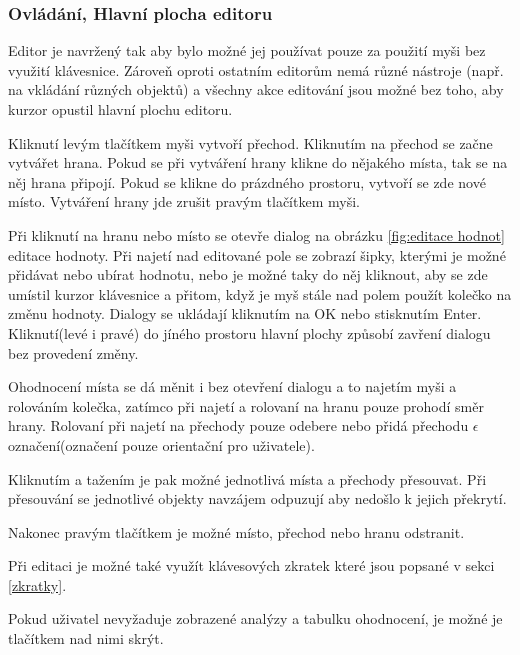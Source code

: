 \documentclass[
  biblatex,
  glossaries,
  printversion
]{kidiplom}
\begin{document}
\subsubsection{Ovládání, Hlavní plocha editoru}\label{hlavní plocha}

Editor je navržený tak aby bylo možné jej používat pouze za použití 
myši bez využití klávesnice. Zároveň oproti ostatním editorům
nemá různé nástroje (např. na vkládání různých objektů) a všechny 
akce editování jsou možné bez toho, aby kurzor opustil hlavní plochu editoru.

Kliknutí levým tlačítkem myši vytvoří přechod. 
Kliknutím na přechod se začne vytvářet hrana. Pokud se při 
vytváření hrany klikne do nějakého místa, tak se na něj hrana 
připojí. Pokud se klikne do prázdného prostoru, vytvoří se zde nové místo.
Vytváření hrany jde zrušit pravým tlačítkem myši.

Při kliknutí na hranu nebo místo se otevře dialog 
na obrázku \ref{fig:editace hodnot} editace hodnoty.
Při najetí nad editované pole se zobrazí šipky, kterými 
je možné přidávat nebo ubírat hodnotu, nebo je možné taky 
do něj kliknout, aby se zde umístil kurzor klávesnice a 
přitom, když je myš stále nad polem použít kolečko na změnu hodnoty.
Dialogy se ukládají kliknutím na OK nebo stisknutím Enter. 
Kliknutí(levé i pravé) do jíného prostoru
hlavní plochy způsobí zavření dialogu bez provedení změny.

Ohodnocení místa se dá měnit i bez otevření dialogu a to najetím myši
a rolováním kolečka, zatímco při najetí a rolovaní na hranu pouze prohodí směr
hrany. Rolovaní při najetí na přechody pouze odebere nebo přidá přechodu 
$\epsilon$ označení(označení pouze orientační pro uživatele).

Kliknutím a tažením je pak možné jednotlivá místa a přechody přesouvat.
Při přesouvání se jednotlivé objekty navzájem odpuzují aby nedošlo k jejich překrytí.

Nakonec pravým tlačítkem je možné místo, přechod nebo hranu odstranit.

Při editaci je možné také využít klávesových zkratek které jsou popsané v sekci \ref{zkratky}.

Pokud uživatel nevyžaduje zobrazené analýzy a tabulku ohodnocení, je možné je tlačítkem nad nimi skrýt.
\end{document}
